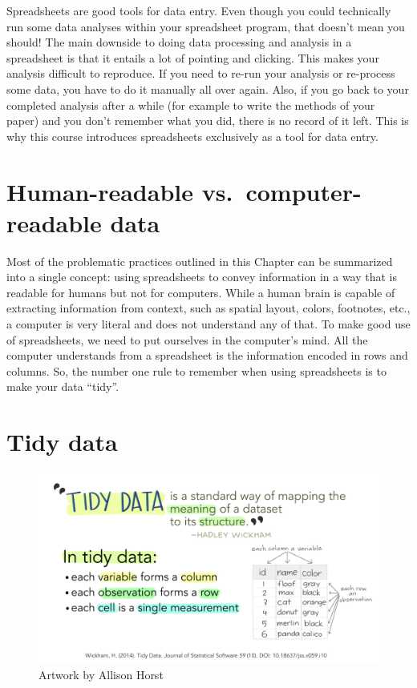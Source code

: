 \documentclass[
]{book}
\begin{document}
Spreadsheets are good tools for data entry. Even though you could technically run some data analyses within your spreadsheet program, that doesn't mean you should! The main downside to doing data processing and analysis in a spreadsheet is that it entails a lot of pointing and clicking. This makes your analysis difficult to reproduce. If you need to re-run your analysis or re-process some data, you have to do it manually all over again. Also, if you go back to your completed analysis after a while (for example to write the methods of your paper) and you don't remember what you did, there is no record of it left. This is why this course introduces spreadsheets exclusively as a tool for data entry.

\hypertarget{human-readable-vs.-computer-readable-data}{%
\section{Human-readable vs.~computer-readable data}\label{human-readable-vs.-computer-readable-data}}

Most of the problematic practices outlined in this Chapter can be summarized into a single concept: using spreadsheets to convey information in a way that is readable for humans but not for computers. While a human brain is capable of extracting information from context, such as spatial layout, colors, footnotes, etc., a computer is very literal and does not understand any of that. To make good use of spreadsheets, we need to put ourselves in the computer's mind. All the computer understands from a spreadsheet is the information encoded in rows and columns. So, the number one rule to remember when using spreadsheets is to make your data ``tidy''.

\hypertarget{tidydata}{%
\section{Tidy data}\label{tidydata}}

\begin{figure}

{\centering \includegraphics[width=0.8\linewidth]{img/tidydata} 

}

\caption{Artwork by Allison Horst}\label{fig:art2}
\end{figure}
\end{document}
